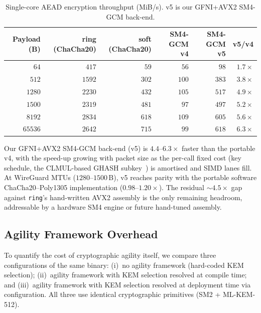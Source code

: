 \documentclass{SCIS2026}
\begin{document}
\begin{table}[htbp]
\centering
\caption{Single-core AEAD encryption throughput (MiB/s).  v5 is our
GFNI+AVX2 SM4-GCM back-end.}
\label{tab:throughput}
\footnotesize
\tabcolsep 5pt
\begin{tabular}{rrrrrr}
\toprule
\textbf{Payload (B)} & \textbf{ring (ChaCha20)} & \textbf{soft (ChaCha20)}  & \textbf{SM4-GCM v4} & \textbf{SM4-GCM v5} & \textbf{v5/v4} \\
\midrule
$64$    & $417$  & $59$  & $56$  & $98$  & $1.7\times$ \\
$512$   & $1592$ & $302$ & $100$ & $383$ & $3.8\times$ \\
$1280$  & $2230$ & $432$ & $105$ & $517$ & $4.9\times$ \\
$1500$  & $2319$ & $481$ & $97$  & $497$ & $5.2\times$ \\
$8192$  & $2834$ & $618$ & $109$ & $605$ & $5.6\times$ \\
$65536$ & $2642$ & $715$ & $99$  & $618$ & $6.3\times$ \\
\bottomrule
\end{tabular}
\end{table}

Our GFNI+AVX2 SM4-GCM back-end (v5) is $4.4$--$6.3\times$ faster than
the portable v4, with the speed-up growing with packet size as the
per-call fixed cost (key schedule, the CLMUL-based GHASH
subkey~\cite{43}) is amortised and SIMD lanes fill.  At WireGuard MTUs ($1280$--$1500$\,B), v5 reaches parity
with the portable software ChaCha20--Poly1305 implementation
($0.98$--$1.20\times$).  The residual
$\sim 4.5\times$ gap against \texttt{ring}'s hand-written AVX2 assembly
is the only remaining headroom, addressable by a hardware SM4 engine or
future hand-tuned assembly.

\subsection{Agility Framework Overhead}
\label{sec:agilityoverhead}

To quantify the cost of cryptographic agility itself, we compare three
configurations of the same binary: (i)~no agility framework (hard-coded
KEM selection); (ii)~agility framework with KEM selection resolved at
compile time; and (iii)~agility framework with KEM selection resolved
at deployment time via configuration.  All three use identical
cryptographic primitives (SM2 + ML-KEM-512).
\end{document}
